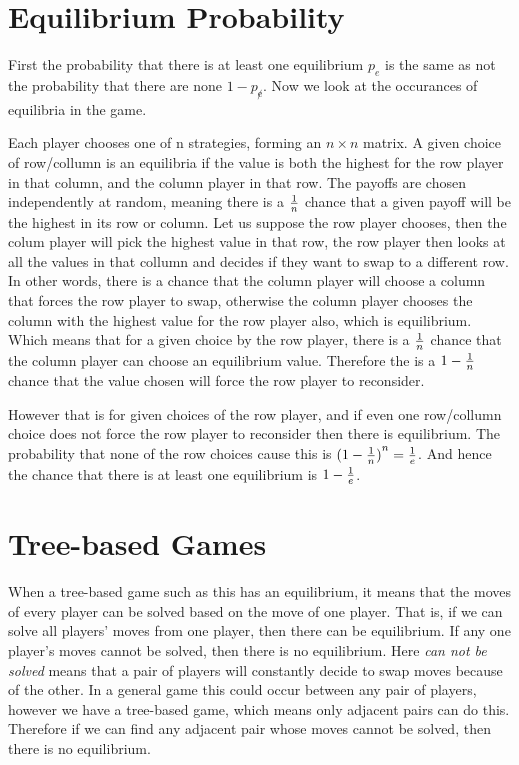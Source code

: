 \documentclass{article}
\begin{document}
\section {Equilibrium Probability}

First the probability that there is at least one equilibrium $p_e$ is the same as not the probability that there are none $1-p_{\not e}$.
Now we look at the occurances of equilibria in the game.

Each player chooses one of n strategies, forming an $n \times n$ matrix.
A given choice of row/collumn is an equilibria if the value is both the highest for the row player in that column, and the column player in that row.
The payoffs are chosen independently at random, meaning there is a $1 \over n$ chance that a given payoff will be the highest in its row or column.
Let us suppose the row player chooses, then the colum player will pick the highest value in that row, the row player then looks at all the values in that collumn and decides if they want to swap to a different row.
In other words, there is a chance that the column player will choose a column that forces the row player to swap, otherwise the column player chooses the column with the highest value for the row player also, which is equilibrium.
Which means that for a given choice by the row player, there is a $1 \over n$ chance that the column player can choose an equilibrium value.
Therefore the is a $1 - {1 \over n}$ chance that the value chosen will force the row player to reconsider.

However that is for given choices of the row player, and if even one row/collumn choice does not force the row player to reconsider then there is equilibrium.
The probability that none of the row choices cause this is ${(1 - {1 \over n})}^n = {1 \over e}$.
And hence the chance that there is at least one equilibrium is $1 - {1 \over e}$.

\section {Tree-based Games}

When a tree-based game such as this has an equilibrium, it means that the moves of every player can be solved based on the move of one player.
That is, if we can solve all players' moves from one player, then there can be equilibrium.
If any one player's moves cannot be solved, then there is no equilibrium.
Here {\em can not be solved} means that a pair of players will constantly decide to swap moves because of the other.
In a general game this could occur between any pair of players, however we have a tree-based game, which means only adjacent pairs can do this.
Therefore if we can find any adjacent pair whose moves cannot be solved, then there is no equilibrium.
\end{document}
